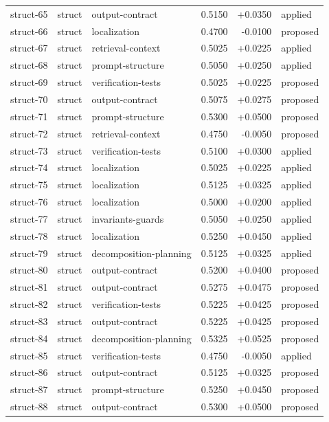 \begin{center}
\begin{longtable}{llp{5.2cm}rrl}
struct-65 & struct & output-contract & 0.5150 & +0.0350 & applied \\
struct-66 & struct & localization & 0.4700 & -0.0100 & proposed \\
struct-67 & struct & retrieval-context & 0.5025 & +0.0225 & applied \\
struct-68 & struct & prompt-structure & 0.5050 & +0.0250 & applied \\
struct-69 & struct & verification-tests & 0.5025 & +0.0225 & proposed \\
struct-70 & struct & output-contract & 0.5075 & +0.0275 & proposed \\
struct-71 & struct & prompt-structure & 0.5300 & +0.0500 & proposed \\
struct-72 & struct & retrieval-context & 0.4750 & -0.0050 & proposed \\
struct-73 & struct & verification-tests & 0.5100 & +0.0300 & applied \\
struct-74 & struct & localization & 0.5025 & +0.0225 & applied \\
struct-75 & struct & localization & 0.5125 & +0.0325 & applied \\
struct-76 & struct & localization & 0.5000 & +0.0200 & applied \\
struct-77 & struct & invariants-guards & 0.5050 & +0.0250 & applied \\
struct-78 & struct & localization & 0.5250 & +0.0450 & applied \\
struct-79 & struct & decomposition-planning & 0.5125 & +0.0325 & applied \\
struct-80 & struct & output-contract & 0.5200 & +0.0400 & proposed \\
struct-81 & struct & output-contract & 0.5275 & +0.0475 & proposed \\
struct-82 & struct & verification-tests & 0.5225 & +0.0425 & proposed \\
struct-83 & struct & output-contract & 0.5225 & +0.0425 & proposed \\
struct-84 & struct & decomposition-planning & 0.5325 & +0.0525 & proposed \\
struct-85 & struct & verification-tests & 0.4750 & -0.0050 & applied \\
struct-86 & struct & output-contract & 0.5125 & +0.0325 & proposed \\
struct-87 & struct & prompt-structure & 0.5250 & +0.0450 & proposed \\
struct-88 & struct & output-contract & 0.5300 & +0.0500 & proposed \\

\end{longtable}
\end{center}
